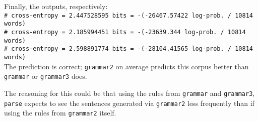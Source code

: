 \documentclass[11pt]{article}
\newcommand{\code}[1]{\texttt{#1}}
\newcommand{\codebox}[1]{\colorbox{codegray}{\texttt{#1}}}
\begin{document}
\begin{enumerate}
		Finally, the outputs, respectively: \vspace{4pt} \\
		\codebox{\# cross-entropy = 2.447528595 bits = -(-26467.57422 log-prob. / 10814 words)\ \ \ \ } \\
		\codebox{\# cross-entropy = 2.185994451 bits = -(-23639.344 log-prob. / 10814 words)\ \ \ \ \ \ } \\
		\codebox{\# cross-entropy = 2.598891774 bits = -(-28104.41565 log-prob. / 10814 words)\ \ \ \ } \\
				
		The prediction is correct; \code{grammar2} on average predicts this corpus better than \code{grammar} or \code{grammar3} does. 
		
		The reasoning for this could be that using the rules from \code{grammar} and \code{grammar3}, \code{parse} expects to see the sentences generated via \code{grammar2} less frequently than if using the rules from \code{grammar2} itself. 
\end{enumerate}
\end{document}
